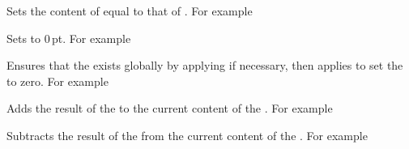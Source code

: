 \documentclass[oneside]{book}
\begin{document}
\begin{function}{\DimSetEq}
\begin{syntax}
  
\end{syntax}
Sets the content of  equal to that of
. For example
\begin{demohigh}
\DimSet \lTmpaDim {10pt}
\DimSetEq \lTmpbDim \lTmpaDim
\DimUse \lTmpbDim
\end{demohigh}
\end{function}

\begin{function}{\DimZero}
\begin{syntax}
 
\end{syntax}
Sets  to $0$\,pt. For example
\begin{demohigh}
\DimSet \lTmpaDim {1em}
\DimZero \lTmpaDim
\DimUse \lTmpaDim
\end{demohigh}
\end{function}

\begin{function}{\DimZeroNew}
\begin{syntax}
 
\end{syntax}
Ensures that the  exists globally by applying
 if necessary, then applies
 to set the  to zero. For example
\begin{demohigh}
\DimZeroNew \lFooSomeDim
\DimUse \lFooSomeDim
\end{demohigh}
\end{function}

\begin{function}{\DimAdd}
\begin{syntax}
  
\end{syntax}
Adds the result of the  to the current
content of the . For example
\begin{demohigh}
\DimSet \lTmpaDim {5.3pt}
\DimAdd \lTmpaDim {2.11pt}
\DimUse \lTmpaDim
\end{demohigh}
\end{function}

\begin{function}{\DimSub}
\begin{syntax}
  
\end{syntax}
Subtracts the result of the  from the
current content of the . For example
\begin{demohigh}
\DimSet \lTmpaDim {5.3pt}
\DimSub \lTmpaDim {2.11pt}
\DimUse \lTmpaDim
\end{demohigh}
\end{function}
\end{document}
